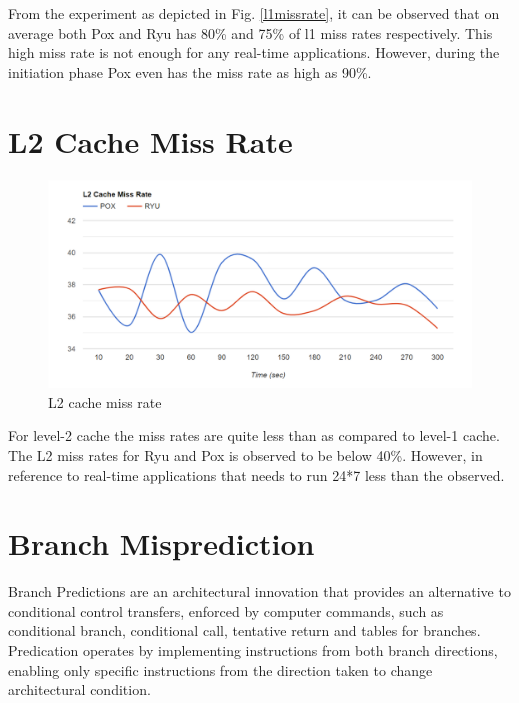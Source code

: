 From the experiment as depicted in Fig. \ref{l1missrate}, it can be observed that on average both Pox and Ryu has 80\% and 75\% of l1 miss rates respectively. This high miss rate is not enough for any real-time applications. However, during the initiation phase Pox even has the miss rate as high as 90\%.

\section{L2 Cache Miss Rate}

\begin{figure}[!hbt]
    \centering
        \includegraphics[width=\textwidth,keepaspectratio]{images/l2_miss_rate.png}
       \caption{L2 cache miss rate}
        \label{l2missrate}
\end{figure}

For level-2 cache the miss rates are quite less than as compared to level-1 cache. The L2 miss rates for Ryu and Pox is observed to be below 40\%. However, in reference to real-time applications that needs to run 24*7 less than the observed.

\section{Branch Misprediction}

Branch Predictions are an architectural innovation that provides an alternative to conditional control transfers, enforced by computer commands, such as conditional branch, conditional call, tentative return and tables for branches. Predication operates by implementing instructions from both branch directions, enabling only specific instructions from the direction taken to change architectural condition.


